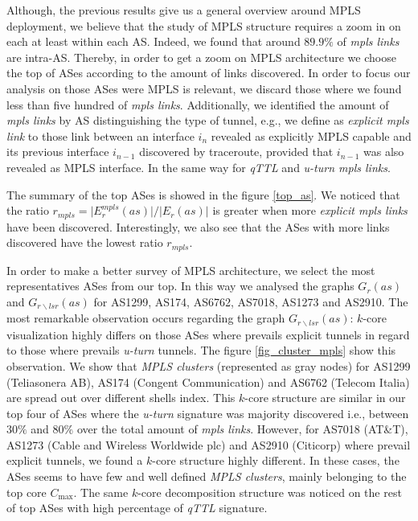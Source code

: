 Although, the previous results give us a general overview around MPLS deployment,
we believe that the study of MPLS structure requires a zoom in on each at least within each AS. Indeed, we found that around
$89.9\%$ of \textit{mpls links} are intra-AS.  Thereby, in order to get
a zoom on MPLS architecture we choose the top of ASes according to the amount of  links discovered. In order to focus our analysis on those ASes were MPLS is relevant, we discard those where we found less than five hundred of \textit{mpls links}. Additionally, we identified  the amount of \textit{mpls links} by AS distinguishing the type of tunnel, e.g., we define as \textit{explicit mpls link} to those link between an interface $i_{n}$ revealed as explicitly MPLS capable and its previous interface $i_{n-1}$ discovered by traceroute, provided that $i_{n-1}$ was also revealed as MPLS interface. In the same way for \textit{qTTL} and  \textit{u-turn mpls links}.

The summary of the top ASes is showed in the figure \ref{top_as}. We noticed that the
ratio $r_{mpls}= \vert E^{mpls}_{r} (as) \vert /\vert E_{r} (as) \vert $  is greater when more  \textit{explicit mpls links} have
been discovered. Interestingly, we also see that the ASes with more
links discovered have the lowest ratio $r_{mpls}$. 

In order to make a better survey of MPLS architecture, we select the most representatives ASes from our top. In this way we analysed the graphs $G_{r}(as)$ and $G_{r\backslash lsr}(as)$ for AS1299, AS174, AS6762, AS7018, AS1273 and AS2910. The most remarkable
observation occurs regarding the graph $G_{r\backslash lsr}(as)$: $k$-core visualization highly differs on those ASes where prevails explicit tunnels in regard to those where prevails \textit{u-turn} tunnels. The figure \ref{fig_cluster_mpls} show this observation.  We show that \textit{MPLS clusters} (represented as gray nodes) for  AS1299 (Teliasonera AB), AS174 (Congent Communication) and AS6762 (Telecom Italia) are spread out over different shells index. This $k$-core structure are similar in our top four of
ASes where the \textit{u-turn} signature was majority discovered i.e., between $30\%$ and  $80\%$ over  the total amount of \textit{mpls links}. However, for AS7018 (AT\&T), AS1273 (Cable and Wireless Worldwide plc) and AS2910 (Citicorp) where prevail explicit tunnels, we found a $k$-core
structure highly different.  In these cases,  the ASes seems to have few
and well defined \textit{MPLS clusters}, mainly belonging to the top core $C_{\max}$. The same $k$-core decomposition structure was noticed  on the rest of top ASes with high percentage of \textit{qTTL} signature. 

